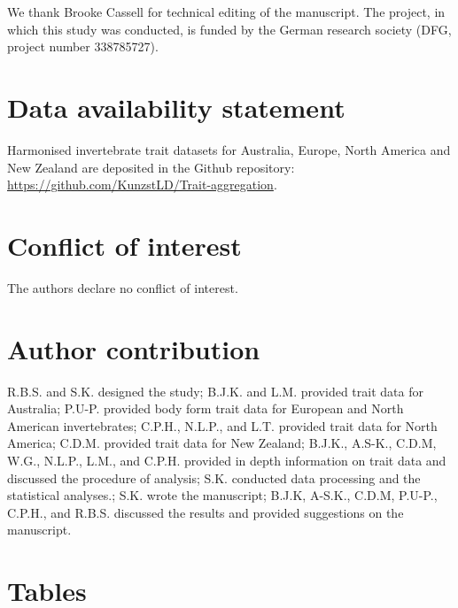 \documentclass[12pt]{article}
\begin{document}
We thank Brooke Cassell for technical editing of the manuscript. The project, in which this study was conducted, is funded by the German research society (DFG, project number 338785727).

\section*{Data availability statement}

Harmonised invertebrate trait datasets for Australia, Europe, North America and New Zealand are deposited in the Github repository: \url{https://github.com/KunzstLD/Trait-aggregation}.

\section*{Conflict of interest}

The authors declare no conflict of interest.

\section*{Author contribution}
R.B.S. and S.K. designed the study; B.J.K. and L.M. provided trait data for Australia; P.U-P. provided body form trait data for European and North American invertebrates; C.P.H., N.L.P., and L.T. provided trait data for North America; C.D.M. provided trait data for New Zealand;
B.J.K., A.S-K., C.D.M, W.G., N.L.P., L.M., and C.P.H. provided in depth information on trait data and discussed the procedure of analysis; S.K. conducted data processing and the statistical analyses.; S.K. wrote the manuscript; B.J.K, A-S.K., C.D.M, P.U-P., C.P.H., and R.B.S. discussed the results and provided suggestions on the manuscript.

\newpage

\printbibliography

\newpage


\section*{Tables}
\end{document}
